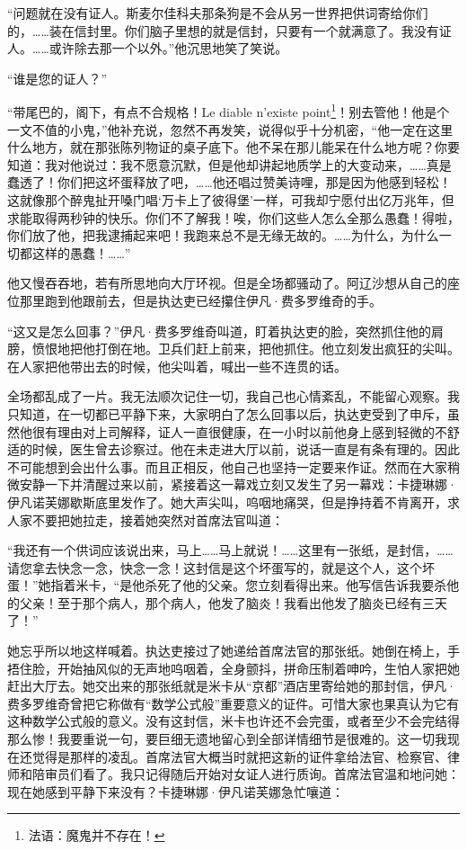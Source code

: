 \par “问题就在没有证人。斯麦尔佳科夫那条狗是不会从另一世界把供词寄给你们的，……装在信封里。你们脑子里想的就是信封，只要有一个就满意了。我没有证人。……或许除去那一个以外。”他沉思地笑了笑说。
\par “谁是您的证人？”
\par “带尾巴的，阁下，有点不合规格！Le diable n’existe point\footnote{法语：魔鬼并不存在！}！别去管他！他是个一文不值的小鬼，”他补充说，忽然不再发笑，说得似乎十分机密，“他一定在这里什么地方，就在那张陈列物证的桌子底下。他不呆在那儿能呆在什么地方呢？你要知道：我对他说过：我不愿意沉默，但是他却讲起地质学上的大变动来，……真是蠢透了！你们把这坏蛋释放了吧，……他还唱过赞美诗哩，那是因为他感到轻松！这就像那个醉鬼扯开嗓门唱‘万卡上了彼得堡’一样，可我却宁愿付出亿万兆年，但求能取得两秒钟的快乐。你们不了解我！唉，你们这些人怎么全那么愚蠢！得啦，你们放了他，把我逮捕起来吧！我跑来总不是无缘无故的。……为什么，为什么一切都这样的愚蠢！……”
\par 他又慢吞吞地，若有所思地向大厅环视。但是全场都骚动了。阿辽沙想从自己的座位那里跑到他跟前去，但是执达吏已经攥住伊凡·费多罗维奇的手。
\par “这又是怎么回事？”伊凡·费多罗维奇叫道，盯着执达吏的脸，突然抓住他的肩膀，愤恨地把他打倒在地。卫兵们赶上前来，把他抓住。他立刻发出疯狂的尖叫。在人家把他带出去的时候，他尖叫着，喊出一些不连贯的话。
\par 全场都乱成了一片。我无法顺次记住一切，我自己也心情紊乱，不能留心观察。我只知道，在一切都已平静下来，大家明白了怎么回事以后，执达吏受到了申斥，虽然他很有理由对上司解释，证人一直很健康，在一小时以前他身上感到轻微的不舒适的时候，医生曾去诊察过。他在未走进大厅以前，说话一直是有条有理的。因此不可能想到会出什么事。而且正相反，他自己也坚持一定要来作证。然而在大家稍微安静一下并清醒过来以前，紧接着这一幕戏立刻又发生了另一幕戏：卡捷琳娜·伊凡诺芙娜歇斯底里发作了。她大声尖叫，呜咽地痛哭，但是挣持着不肯离开，求人家不要把她拉走，接着她突然对首席法官叫道：
\par “我还有一个供词应该说出来，马上……马上就说！……这里有一张纸，是封信，……请您拿去快念一念，快念一念！这封信是这个坏蛋写的，就是这个人，这个坏蛋！”她指着米卡，“是他杀死了他的父亲。您立刻看得出来。他写信告诉我要杀他的父亲！至于那个病人，那个病人，他发了脑炎！我看出他发了脑炎已经有三天了！”
\par 她忘乎所以地这样喊着。执达吏接过了她递给首席法官的那张纸。她倒在椅上，手捂住脸，开始抽风似的无声地呜咽着，全身颤抖，拼命压制着呻吟，生怕人家把她赶出大厅去。她交出来的那张纸就是米卡从“京都”酒店里寄给她的那封信，伊凡·费多罗维奇曾把它称做有“数学公式般”重要意义的证件。可惜大家也果真认为它有这种数学公式般的意义。没有这封信，米卡也许还不会完蛋，或者至少不会完结得那么惨！我要重说一句，要巨细无遗地留心到全部详情细节是很难的。这一切我现在还觉得是那样的凌乱。首席法官大概当时就把这新的证件拿给法官、检察官、律师和陪审员们看了。我只记得随后开始对女证人进行质询。首席法官温和地问她：现在她感到平静下来没有？卡捷琳娜·伊凡诺芙娜急忙嚷道：
